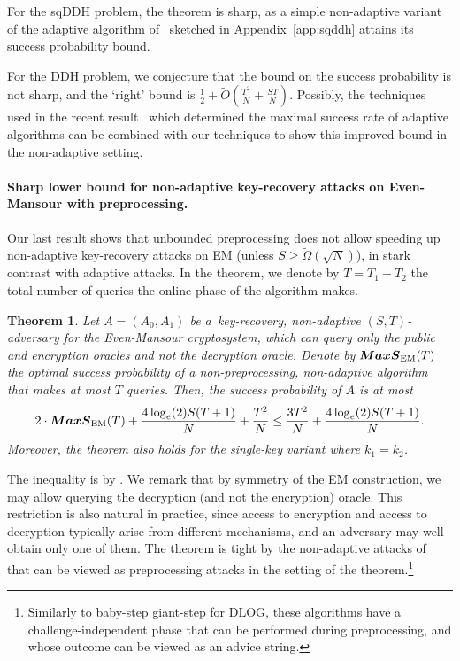 \documentclass[11pt]{article}
\newtheorem{theorem}{Theorem}[section]
\newcommand{\MAXS}{\boldsymbol{MaxS}}
\begin{document}
For the sqDDH problem, the theorem is sharp, as a simple non-adaptive variant of the adaptive algorithm of~\cite{Corrigan-GibbsK18} 
sketched in Appendix~\ref{app:sqddh}
attains its success probability bound. %
 
For the DDH problem, 
we conjecture that the bound on the success probability is not sharp, and the `right' bound is $\frac{1}{2} + \tilde{O}(\frac{T^2}{N}+\frac{ST}{N})$.
Possibly, the techniques used in the recent result~\cite{AkshimaBGXY24} which determined the maximal success rate of adaptive algorithms can be combined with our techniques to show this improved bound in the non-adaptive setting.


\paragraph{Sharp lower bound for non-adaptive key-recovery attacks on Even-Mansour with preprocessing.} Our last result shows that unbounded preprocessing does not allow speeding up non-adaptive key-recovery attacks on EM (unless $S \geq \tilde{\Omega}(\sqrt{N})$), in stark contrast with adaptive attacks. In the theorem, we denote by $T=T_1+T_2$ the 
total number of queries the online phase of the algorithm makes.
\begin{theorem}\label{thm:em-nonadaptive-intro}
Let $A=(A_0,A_1)$ be a~key-recovery, non-adaptive $(S,T)$-adversary for the Even-Mansour cryptosystem, which can query only the public and encryption oracles and not the decryption oracle. Denote by $\MAXS_{\textup{EM}}(T)$ the optimal success probability of a non-preprocessing, non-adaptive algorithm that makes at most $T$ queries. Then, the success probability of $A$ is at most
$$
2\cdot \MAXS_{\textup{EM}}(T) + \frac{4\log_e(2) S (T+1)}{N} + \frac{T^2}{N} \leq
    \frac{3T^2 }{N}  + \frac{4\log_e(2) S(T+1)}{N}.
$$
Moreover, the theorem also holds for the single-key variant where $k_1=k_2$.
\end{theorem}
The inequality is by \cite{DKS15,EvenM97}.
We remark that by symmetry of the EM construction, we may allow querying the decryption (and not the encryption) oracle. This restriction is also natural in practice, since access to encryption and access to decryption typically arise from different mechanisms, and an adversary may well obtain only one of them.
The theorem is tight by the non-adaptive attacks of~\cite{BW00,Daemen91,DKS15} that can be viewed as preprocessing attacks in the setting of the theorem.\footnote{Similarly to baby-step giant-step for DLOG, these algorithms have a challenge-independent phase that can be performed during preprocessing, and whose outcome can be viewed as an advice string.}
\end{document}
